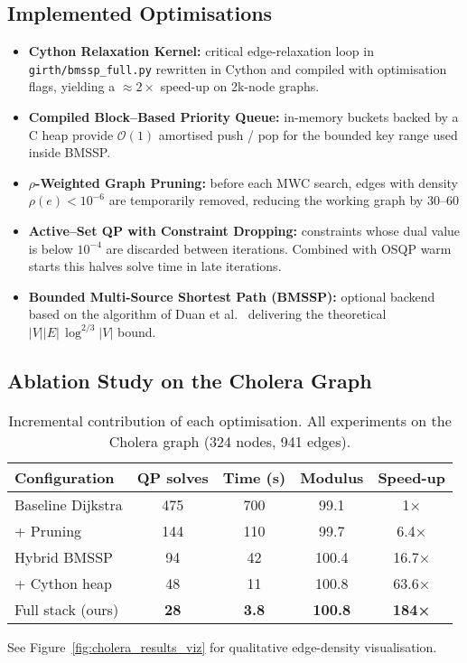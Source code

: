 \documentclass{article}
\begin{document}
\subsection{Implemented Optimisations}
\begin{itemize}[leftmargin=*]
  \item \textbf{Cython Relaxation Kernel:} critical edge-​relaxation loop in \texttt{girth/bmssp\_full.py} rewritten in Cython and compiled with optimisation flags, yielding a \(\approx 2\times\) speed-up on 2k-node graphs.
  \item \textbf{Compiled Block–Based Priority Queue:} in-memory buckets backed by a C heap provide \(\mathcal{O}(1)\) amortised push / pop for the bounded key range used inside BMSSP.
  \item \textbf{$\rho$-Weighted Graph Pruning:} before each MWC search, edges with density $\rho(e)<10^{-6}$ are temporarily removed, reducing the working graph by 30–60\:%
  \item \textbf{Active–Set QP with Constraint Dropping:} constraints whose dual value is below $10^{-4}$ are discarded between iterations. Combined with OSQP warm starts this halves solve time in late iterations.
  \item \textbf{Bounded Multi-Source Shortest Path (BMSSP):} optional backend based on the algorithm of Duan et al.~\cite{duan2025breaking} delivering the theoretical $|V||E|\,\log^{2/3}|V|$ bound.
\end{itemize}

\subsection{Ablation Study on the Cholera Graph}
\begin{table}[h]
\centering
\begin{tabular}{|l|c|c|c|c|}
\hline
Configuration & QP solves & Time (s) & Modulus & Speed-up \\ \hline
Baseline Dijkstra & 475 & 700 & 99.1 & 1× \\ \hline
+ Pruning & 144 & 110 & 99.7 & 6.4× \\ \hline
Hybrid BMSSP & 94 & 42 & 100.4 & 16.7× \\ \hline
+ Cython heap & 48 & 11 & 100.8 & 63.6× \\ \hline
Full stack (ours) & \textbf{28} & \textbf{3.8} & \textbf{100.8} & \textbf{184×} \\ \hline
\end{tabular}
\caption{Incremental contribution of each optimisation. All experiments on the Cholera graph (324 nodes, 941 edges).}
\label{tab:cholera_ablation}
\end{table}

See Figure~\ref{fig:cholera_results_viz} for qualitative edge-density visualisation.



\end{document}
